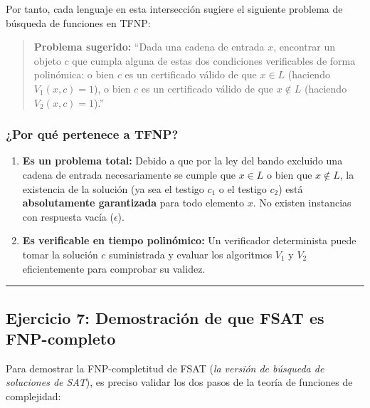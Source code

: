 \documentclass[12pt]{book} %
\begin{document}
Por tanto, cada lenguaje en esta intersección sugiere el siguiente
problema de búsqueda de funciones en TFNP:

\begin{quote}
\textbf{Problema sugerido:} ``Dada una cadena de entrada \(x\),
encontrar un objeto \(c\) que cumpla alguna de estas dos condiciones
verificables de forma polinómica: o bien \(c\) es un certificado válido
de que \(x \in L\) (haciendo \(V_1(x, c) = 1\)), o bien \(c\) es un
certificado válido de que \(x \notin L\) (haciendo \(V_2(x, c) = 1\)).''
\end{quote}

\hypertarget{por-quuxe9-pertenece-a-tfnp}{%
\subsubsection{¿Por qué pertenece a
TFNP?}\label{por-quuxe9-pertenece-a-tfnp}}

\begin{enumerate}
\def\labelenumi{\arabic{enumi}.}
\item
  \textbf{Es un problema total:} Debido a que por la ley del bando
  excluido una cadena de entrada necesariamente se cumple que
  \(x \in L\) o bien que \(x \notin L\), la existencia de la solución
  (ya sea el testigo \(c_1\) o el testigo \(c_2\)) está
  \textbf{absolutamente garantizada} para todo elemento \(x\). No
  existen instancias con respuesta vacía (\(\epsilon\)).
\item
  \textbf{Es verificable en tiempo polinómico:} Un verificador
  determinista puede tomar la solución \(c\) suministrada y evaluar los
  algoritmos \(V_1\) y \(V_2\) eficientemente para comprobar su validez.
\end{enumerate}

\begin{center}\rule{0.5\linewidth}{0.5pt}\end{center}

\hypertarget{ejercicio-7-demostraciuxf3n-de-que-fsat-es-fnp-completo}{%
\subsection{Ejercicio 7: Demostración de que FSAT es
FNP-completo}\label{ejercicio-7-demostraciuxf3n-de-que-fsat-es-fnp-completo}}

Para demostrar la FNP-completitud de FSAT (\emph{la versión de búsqueda
de soluciones de SAT}), es preciso validar los dos pasos de la teoría de
funciones de complejidad:
\end{document}
